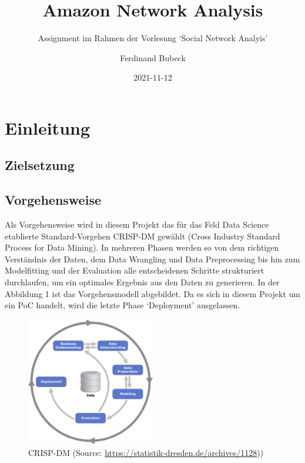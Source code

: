 \documentclass[
  12 pt,
]{article}
\title{Amazon Network Analysis}
\subtitle{Assignment im Rahmen der Vorlesung `Social Network Analyis'}
\author{Ferdinand Bubeck}
\date{2021-11-12}
\begin{document}
\maketitle

\renewcommand*\contentsname{Inhaltsverzeichnis}
{
\setcounter{tocdepth}{2}
\tableofcontents
}
\newpage

\hypertarget{einleitung}{%
\section{Einleitung}\label{einleitung}}

\hypertarget{zielsetzung}{%
\subsection{Zielsetzung}\label{zielsetzung}}

\hypertarget{vorgehensweise}{%
\subsection{Vorgehensweise}\label{vorgehensweise}}

Als Vorgehensweise wird in diesem Projekt das für das Feld Data Science
etablierte Standard-Vorgehen CRISP-DM gewählt (Cross Industry Standard
Process for Data Mining). In mehreren Phasen werden so von dem richtigen
Verständnis der Daten, dem Data Wrangling und Data Preprocessing bis hin
zum Modelfitting und der Evaluation alle entscheidenen Schritte
strukturiert durchlaufen, um ein optimales Ergebnis aus den Daten zu
generieren. In der Abbildung 1 ist das Vorgehensmodell abgebildet. Da es
sich in diesem Projekt um ein PoC handelt, wird die letzte Phase
`Deployment' ausgelassen.

\begin{figure}
\centering
\includegraphics[width=0.5\textwidth,height=\textheight]{Data/CRISP-DM_Process_Diagram1.png}
\caption{CRISP-DM (Source:
\url{https://statistik-dresden.de/archives/1128}))}
\end{figure}
\end{document}
